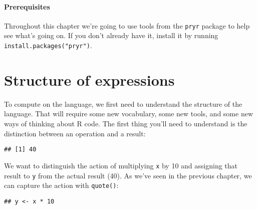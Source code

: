\hypertarget{prerequisites}{%
\paragraph{Prerequisites}\label{prerequisites}}

Throughout this chapter we're going to use tools from the \texttt{pryr}
package to help see what's going on. If you don't already have it,
install it by running \texttt{install.packages("pryr")}.

\hypertarget{structure-of-expressions}{%
\section{Structure of expressions}\label{structure-of-expressions}}

To compute on the language, we first need to understand the structure of
the language. That will require some new vocabulary, some new tools, and
some new ways of thinking about R code. The first thing you'll need to
understand is the distinction between an operation and a result:

\begin{Shaded}
\begin{Highlighting}[]
\StringTok{ }
\StringTok{ }\OperatorTok{*}\StringTok{ }
\end{Highlighting}
\end{Shaded}

\begin{verbatim}
## [1] 40
\end{verbatim}

We want to distinguish the action of multiplying \texttt{x} by 10 and
assigning that result to \texttt{y} from the actual result (40). As
we've seen in the previous chapter, we can capture the action with
\texttt{quote()}:

\begin{Shaded}
\begin{Highlighting}[]
\StringTok{ }\StringTok{ }\OperatorTok{*}\StringTok{ }\NormalTok{)}
\end{Highlighting}
\end{Shaded}

\begin{verbatim}
## y <- x * 10
\end{verbatim}

